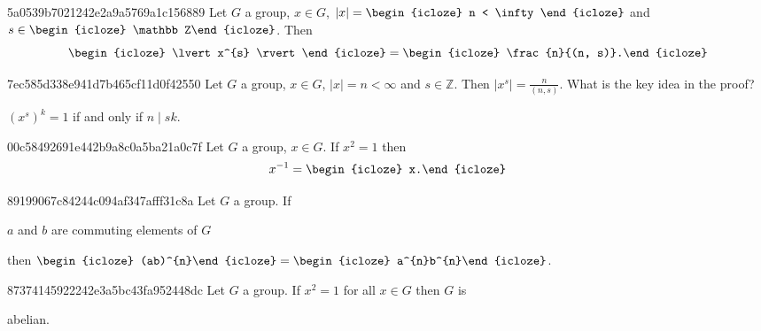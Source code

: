\begin{note}{5a0539b7021242e2a9a5769a1c156889}
    Let \({ G }\) a group, \({ x \in G }\), \({ \lvert x \rvert = \begin{icloze}{3}n < \infty\end{icloze} }\) and \({ s \in \begin{icloze}{4}\mathbb Z\end{icloze} }\).
    Then
    \[
        \begin{icloze}{2}\lvert x^{s} \rvert\end{icloze} = \begin{icloze}{1}\frac{n}{(n, s)}.\end{icloze}
    \]
\end{note}

\begin{note}{7ec585d338e941d7b465cf11d0f42550}
    Let \({ G }\) a group, \({ x \in G }\), \({ \lvert x \rvert = n < \infty }\) and \({ s \in \mathbb Z }\).
    Then \({ \lvert x^{s} \rvert = \frac{n}{(n, s)} }\).
    What is the key idea in the proof?

    \begin{cloze}{1}
        \({ (x^{s})^{k} = 1 }\) if and only if \({ n \mid sk }\).
    \end{cloze}
\end{note}

\begin{note}{00c58492691e442b9a8c0a5ba21a0c7f}
    Let \({ G }\) a group, \({ x \in G }\). If \({ x^2 = 1 }\) then
    \[
        x^{-1} = \begin{icloze}{1}x.\end{icloze}
    \]
\end{note}

\begin{note}{89199067c84244c094af347afff31c8a}
    Let \({ G }\) a group. If \begin{icloze}{3}\({ a }\) and \({ b }\) are commuting elements of \({ G }\)\end{icloze} then \({ \begin{icloze}{2}(ab)^{n}\end{icloze} = \begin{icloze}{1}a^{n}b^{n}\end{icloze} }\).
\end{note}

\begin{note}{87374145922242e3a5bc43fa952448dc}
    Let \({ G }\) a group. If \({ x^2 = 1 }\) for all \({ x \in G }\) then \({ G }\) is \begin{icloze}{1}abelian.\end{icloze}
\end{note}

